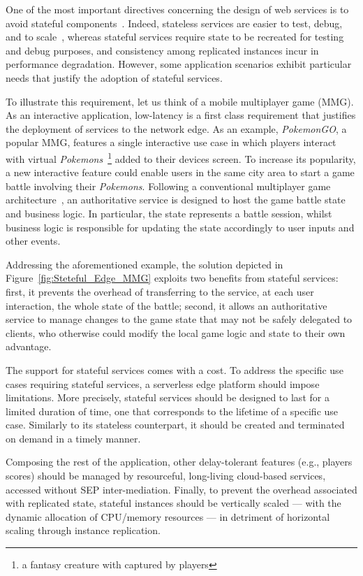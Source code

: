 \documentclass[letterpaper, 10 pt, conference]{ieeeconf}  %
\begin{document}
One of the most important directives concerning the design of web services is to avoid stateful components~\cite{}. Indeed, stateless services are easier to test, debug, and to scale~\cite{}, whereas stateful services require state to be recreated for testing and debug purposes, and consistency among replicated instances incur in performance degradation. However, some application scenarios exhibit particular needs that justify the adoption of stateful services.


To illustrate this requirement, let us think of a mobile multiplayer game (MMG). As an interactive application, low-latency is a first class requirement that justifies the deployment of services to the network edge. As an example, \textit{PokemonGO}, a popular MMG, features a single interactive use case in which players interact with virtual \textit{Pokemons}~\footnote{a fantasy creature with captured by players} added to their devices screen. 
%
To increase its popularity, a new interactive feature could enable users in the same city area to start a game battle involving their \textit{Pokemons}. Following a conventional multiplayer game architecture~\cite{}, an authoritative service is designed to host the game battle state and business logic. In particular, the state represents a battle session, whilst business logic is responsible for updating the state accordingly to user inputs and other events. 

Addressing the aforementioned example, the solution depicted in Figure~\ref{fig:Steteful_Edge_MMG} exploits two benefits from stateful services: first, it prevents the overhead of transferring to the service, at each user interaction, the whole state of the battle; second, it allows an authoritative service to manage changes to the game state that may not be safely delegated to clients, who otherwise could modify the local game logic and state to their own advantage.

The support for stateful services comes with a cost. To address the specific use cases requiring stateful services, a serverless edge platform should impose limitations. More precisely, stateful services should be designed to last for a limited duration of time, one that corresponds to the lifetime of a specific use case. Similarly to its stateless counterpart, it should be created and terminated on demand in a timely manner.

Composing the rest of the application, other delay-tolerant features (e.g., players scores) should be managed by resourceful, long-living cloud-based services, accessed without SEP inter-mediation. Finally, to prevent the overhead associated with replicated state, stateful instances should be vertically scaled --- with the dynamic allocation of CPU/memory resources --- in detriment of horizontal scaling through instance replication. %
\end{document}
